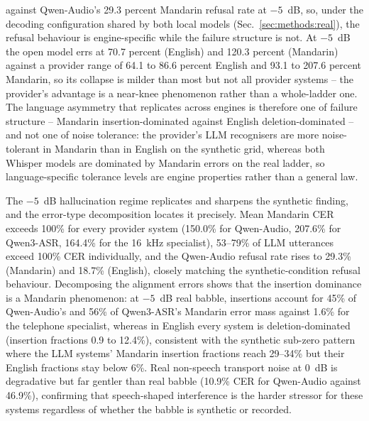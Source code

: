 against Qwen-Audio's 29.3 percent Mandarin refusal rate at $-5$~dB, so,
under the decoding configuration shared by both local models
(Sec.~\ref{sec:methods:real}), the refusal behaviour is engine-specific
while the failure structure is not.
At $-5$~dB the open model errs at 70.7 percent (English) and 120.3 percent
(Mandarin) against a provider range of 64.1 to 86.6 percent English and
93.1 to 207.6 percent Mandarin, so its collapse is milder than most but
not all provider systems -- the provider's advantage is a near-knee
phenomenon rather than a whole-ladder one. The language asymmetry
that replicates across engines is therefore one of failure structure --
Mandarin insertion-dominated against English deletion-dominated -- and not
one of noise tolerance: the provider's LLM recognisers are more
noise-tolerant in Mandarin than in English on the synthetic grid, whereas
both Whisper models are dominated by Mandarin errors on the real ladder,
so
language-specific tolerance levels are engine properties rather than a
general law.

The $-5$~dB hallucination regime replicates and sharpens the synthetic
finding, and the error-type decomposition locates it precisely. Mean
Mandarin CER exceeds 100\% for every provider system (150.0\% for
Qwen-Audio, 207.6\% for Qwen3-ASR, 164.4\% for the 16~kHz specialist), 53--79\% of
LLM utterances exceed 100\% CER individually, and the Qwen-Audio refusal
rate rises to 29.3\% (Mandarin) and 18.7\% (English), closely matching
the synthetic-condition refusal behaviour. Decomposing the alignment
errors shows that the insertion dominance is a Mandarin phenomenon: at
$-5$~dB real babble, insertions account for 45\% of Qwen-Audio's and
56\% of Qwen3-ASR's Mandarin error mass against 1.6\% for the telephone
specialist, whereas in English every system is deletion-dominated
(insertion fractions 0.9 to 12.4\%), consistent with the synthetic
sub-zero pattern where the LLM systems' Mandarin insertion fractions reach
29--34\% but their English fractions stay below 6\%. Real non-speech
transport noise at 0~dB is degradative but far gentler than real babble
(10.9\% CER for Qwen-Audio against 46.9\%), confirming that
speech-shaped interference is the harder stressor for these systems
regardless of whether the babble is synthetic or recorded.

